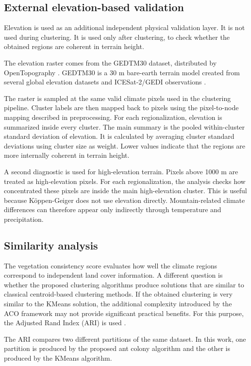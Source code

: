\documentclass[11pt]{article}
\begin{document}
\subsection{External elevation-based validation}
Elevation is used as an additional independent physical validation layer. It is not used during clustering. It is used only after clustering, to check whether the obtained regions are coherent in terrain height.

The elevation raster comes from the GEDTM30 dataset, distributed by OpenTopography \cite{ho2025gedtm30data}. GEDTM30 is a 30 m bare-earth terrain model created from several global elevation datasets and ICESat-2/GEDI observations \cite{ho2025gedtm30}.

The raster is sampled at the same valid climate pixels used in the clustering pipeline. Cluster labels are then mapped back to pixels using the pixel-to-node mapping described in preprocessing. For each regionalization, elevation is summarized inside every cluster. The main summary is the pooled within-cluster standard deviation of elevation. It is calculated by averaging cluster standard deviations using cluster size as weight. Lower values indicate that the regions are more internally coherent in terrain height.

A second diagnostic is used for high-elevation terrain. Pixels above 1000 m are treated as high-elevation pixels. For each regionalization, the analysis checks how concentrated these pixels are inside the main high-elevation cluster. This is useful because Köppen-Geiger does not use elevation directly. Mountain-related climate differences can therefore appear only indirectly through temperature and precipitation.


\subsection{Similarity analysis}
The vegetation consistency score evaluates how well the climate regions correspond to independent land cover information. A different question is whether the proposed clustering algorithms produce solutions that are similar to classical centroid-based clustering methods. If the obtained clustering is very similar to the KMeans solution, the additional complexity introduced by the ACO framework may not provide significant practical benefits. For this purpose, the Adjusted Rand Index (ARI) is used \cite{hubert1985}.

The ARI compares two different partitions of the same dataset. In this work, one partition is produced by the proposed ant colony algorithm and the other is produced by the KMeans algorithm.
\end{document}
